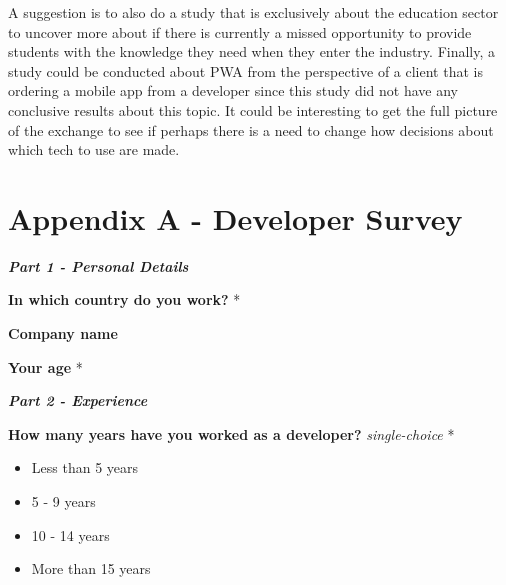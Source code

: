 \documentclass[a4paper,12pt]{article}
\renewcommand{\arraystretch}{1.5}
\begin{document}
A suggestion is to also do a study that is exclusively about the education sector to uncover more about if there is currently a missed opportunity to provide students with the knowledge they need when they enter the industry.
Finally, a study could be conducted about PWA from the perspective of a client that is ordering a mobile app from a developer since this study did not have any conclusive results about this topic. It could be interesting to get the full picture of the exchange to see if perhaps there is a need to change how decisions about which tech to use are made.

\newpage
\hypersetup{urlcolor=black}
%
%
\printbibliography[heading=bibintoc]

\newpage
\setcounter{page}{1} %
\appendix

\setlength{\parindent}{0pt}
\setlength{\arrayrulewidth}{0.3mm}
\setlength{\tabcolsep}{4pt}
\renewcommand{\arraystretch}{1.5}

\section{Appendix A - Developer Survey}
\label{Appendix_devSurvey}

\textbf{\textit{Part 1 - Personal Details}}

\textbf{In which country do you work?} *

\quad

\textbf{Company name}

\quad

\textbf{Your age} *

\quad

\quad

\textbf{\textit{Part 2 - Experience}}

\textbf{How many years have you worked as a developer?} \textit{single-choice} *
\begin{itemize}
    \item Less than 5 years
    \item 5 - 9 years
    \item 10 - 14 years
    \item More than 15 years
\end{itemize}
\end{document}
